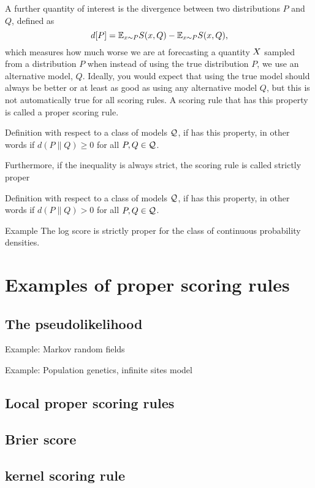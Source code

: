 A further quantity of interest is the divergence between two distributions $P$ and $Q$, defined as
\begin{equation}
	d[P] = \mathbb{E}_{x\sim P} S(x,Q) - \mathbb{E}_{x\sim P} S(x,Q)\mbox{,}
\end{equation}
which measures how much worse we are at forecasting a quantity $X$ sampled from a distribution $P$ when instead of using the true distribution $P$, we use an alternative model, $Q$. Ideally, you would expect that using the true model should always be better or at least as good as using any alternative model $Q$, but this is not automatically true for all scoring rules. A scoring rule that has this property is called a proper scoring rule.

Definition with respect to a class of models $\mathcal{Q}$, if  has this property, in other words if $d(P\|Q)\geq 0$ for all $P,Q\in\mathcal{Q}$.

Furthermore, if the inequality is always strict, the scoring rule is called strictly proper

Definition with respect to a class of models $\mathcal{Q}$, if  has this property, in other words if $d(P\|Q)>0$ for all $P,Q\in\mathcal{Q}$.

Example The log score is strictly proper for the class of continuous probability densities.

\section{Examples of proper scoring rules}

\subsection{The pseudolikelihood}

Example: Markov random fields

Example: Population genetics, infinite sites model

\subsection{Local proper scoring rules}

\subsection{Brier score}

\subsection{kernel scoring rule}

